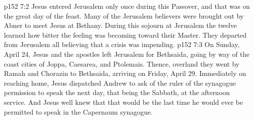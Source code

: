 \vs p152 7:2 Jesus entered Jerusalem only once during this Passover, and that was on the great day of the feast. Many of the Jerusalem believers were brought out by Abner to meet Jesus at Bethany. During this sojourn at Jerusalem the twelve learned how bitter the feeling was becoming toward their Master. They departed from Jerusalem all believing that a crisis was impending.
\vs p152 7:3 On Sunday, April 24, Jesus and the apostles left Jerusalem for Bethsaida, going by way of the coast cities of Joppa, Caesarea, and Ptolemais. Thence, overland they went by Ramah and Chorazin to Bethsaida, arriving on Friday, April 29. Immediately on reaching home, Jesus dispatched Andrew to ask of the ruler of the synagogue permission to speak the next day, that being the Sabbath, at the afternoon service. And Jesus well knew that that would be the last time he would ever be permitted to speak in the Capernaum synagogue.
\quizlink
